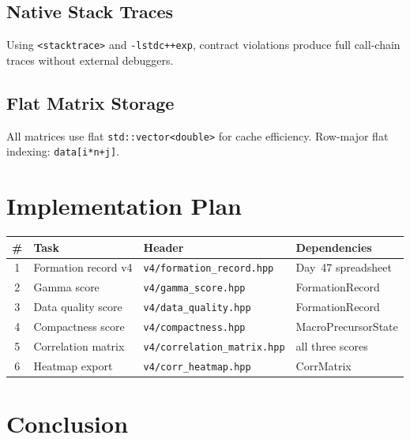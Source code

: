 \documentclass[11pt]{article}
\begin{document}
\subsection{Native Stack Traces}

Using \texttt{<stacktrace>} and \texttt{-lstdc++exp}, contract
violations produce full call-chain traces without external debuggers.

\subsection{Flat Matrix Storage}

All matrices use flat \texttt{std::vector<double>} for cache efficiency.
Row-major flat indexing: \texttt{data[i*n+j]}.

\section{Implementation Plan}
\label{sec:plan}

\begin{center}
\renewcommand{\arraystretch}{1.3}
\begin{tabular}{clll}
\toprule
\# & Task & Header & Dependencies \\
\midrule
1 & Formation record v4   & \texttt{v4/formation\_record.hpp} & Day~47 spreadsheet \\
2 & Gamma score           & \texttt{v4/gamma\_score.hpp}      & FormationRecord \\
3 & Data quality score    & \texttt{v4/data\_quality.hpp}     & FormationRecord \\
4 & Compactness score     & \texttt{v4/compactness.hpp}       & MacroPrecursorState \\
5 & Correlation matrix    & \texttt{v4/correlation\_matrix.hpp} & all three scores \\
6 & Heatmap export        & \texttt{v4/corr\_heatmap.hpp}     & CorrMatrix \\
\bottomrule
\end{tabular}
\end{center}

\section{Conclusion}
\label{sec:conclusion}
\end{document}
